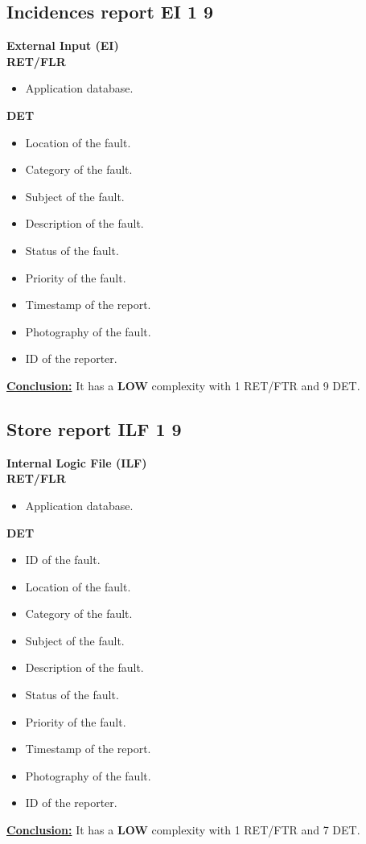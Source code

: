 \subsection{Incidences report	EI	1	9}
\textbf{External Input (EI)} \\ 
\textbf{RET/FLR}
\begin{itemize}
\item Application database.
\end{itemize}
\textbf{DET}
\begin{itemize}
\item Location of the fault.
\item Category of the fault.
\item Subject of the fault.
\item Description of the fault.
\item Status of the fault.
\item Priority of the fault.
\item Timestamp of the report.
\item Photography of the fault.
\item ID of the reporter.
\end{itemize}
\textbf{\underline{Conclusion:}} It has a \textbf{LOW} complexity with 1 RET/FTR and 9 DET.

\subsection{Store report	ILF	1	9}
\textbf{Internal Logic File (ILF)} \\ 
\textbf{RET/FLR}
\begin{itemize}
\item Application database.
\end{itemize}
\textbf{DET}
\begin{itemize}
\item ID of the fault.
\item Location of the fault.
\item Category of the fault.
\item Subject of the fault.
\item Description of the fault.
\item Status of the fault.
\item Priority of the fault.
\item Timestamp of the report.
\item Photography of the fault.
\item ID of the reporter.
\end{itemize}
\textbf{\underline{Conclusion:}} It has a \textbf{LOW} complexity with 1 RET/FTR and 7 DET.


